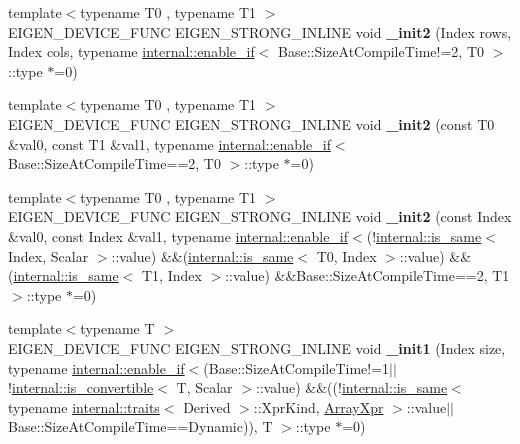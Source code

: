 \begin{DoxyCompactItemize}
{\footnotesize template$<$typename T0 , typename T1 $>$ }\\E\+I\+G\+E\+N\+\_\+\+D\+E\+V\+I\+C\+E\+\_\+\+F\+U\+NC E\+I\+G\+E\+N\+\_\+\+S\+T\+R\+O\+N\+G\+\_\+\+I\+N\+L\+I\+NE void {\bfseries \+\_\+init2} (Index rows, Index cols, typename \mbox{\hyperlink{struct_eigen_1_1internal_1_1enable__if}{internal\+::enable\+\_\+if}}$<$ Base\+::\+Size\+At\+Compile\+Time!=2, T0 $>$\+::type $\ast$=0)
\item 
\mbox{\label{class_eigen_1_1_plain_object_base_adf6cee011f287daa6488e269c80f3c1c}} 
{\footnotesize template$<$typename T0 , typename T1 $>$ }\\E\+I\+G\+E\+N\+\_\+\+D\+E\+V\+I\+C\+E\+\_\+\+F\+U\+NC E\+I\+G\+E\+N\+\_\+\+S\+T\+R\+O\+N\+G\+\_\+\+I\+N\+L\+I\+NE void {\bfseries \+\_\+init2} (const T0 \&val0, const T1 \&val1, typename \mbox{\hyperlink{struct_eigen_1_1internal_1_1enable__if}{internal\+::enable\+\_\+if}}$<$ Base\+::\+Size\+At\+Compile\+Time==2, T0 $>$\+::type $\ast$=0)
\item 
\mbox{\label{class_eigen_1_1_plain_object_base_a2847adb1d1c4f388541cc36db1e3349d}} 
{\footnotesize template$<$typename T0 , typename T1 $>$ }\\E\+I\+G\+E\+N\+\_\+\+D\+E\+V\+I\+C\+E\+\_\+\+F\+U\+NC E\+I\+G\+E\+N\+\_\+\+S\+T\+R\+O\+N\+G\+\_\+\+I\+N\+L\+I\+NE void {\bfseries \+\_\+init2} (const Index \&val0, const Index \&val1, typename \mbox{\hyperlink{struct_eigen_1_1internal_1_1enable__if}{internal\+::enable\+\_\+if}}$<$(!\mbox{\hyperlink{struct_eigen_1_1internal_1_1is__same}{internal\+::is\+\_\+same}}$<$ Index, Scalar $>$\+::value) \&\&(\mbox{\hyperlink{struct_eigen_1_1internal_1_1is__same}{internal\+::is\+\_\+same}}$<$ T0, Index $>$\+::value) \&\&(\mbox{\hyperlink{struct_eigen_1_1internal_1_1is__same}{internal\+::is\+\_\+same}}$<$ T1, Index $>$\+::value) \&\&Base\+::\+Size\+At\+Compile\+Time==2, T1 $>$\+::type $\ast$=0)
\item 
\mbox{\label{class_eigen_1_1_plain_object_base_ae67658cea63893ac50e3809c533649ca}} 
{\footnotesize template$<$typename T $>$ }\\E\+I\+G\+E\+N\+\_\+\+D\+E\+V\+I\+C\+E\+\_\+\+F\+U\+NC E\+I\+G\+E\+N\+\_\+\+S\+T\+R\+O\+N\+G\+\_\+\+I\+N\+L\+I\+NE void {\bfseries \+\_\+init1} (Index size, typename \mbox{\hyperlink{struct_eigen_1_1internal_1_1enable__if}{internal\+::enable\+\_\+if}}$<$(Base\+::\+Size\+At\+Compile\+Time!=1$\vert$$\vert$!\mbox{\hyperlink{struct_eigen_1_1internal_1_1is__convertible}{internal\+::is\+\_\+convertible}}$<$ T, Scalar $>$\+::value) \&\&((!\mbox{\hyperlink{struct_eigen_1_1internal_1_1is__same}{internal\+::is\+\_\+same}}$<$ typename \mbox{\hyperlink{struct_eigen_1_1internal_1_1traits}{internal\+::traits}}$<$ Derived $>$\+::Xpr\+Kind, \mbox{\hyperlink{struct_eigen_1_1_array_xpr}{Array\+Xpr}} $>$\+::value$\vert$$\vert$Base\+::\+Size\+At\+Compile\+Time==Dynamic)), T $>$\+::type $\ast$=0)

\end{DoxyCompactItemize}
